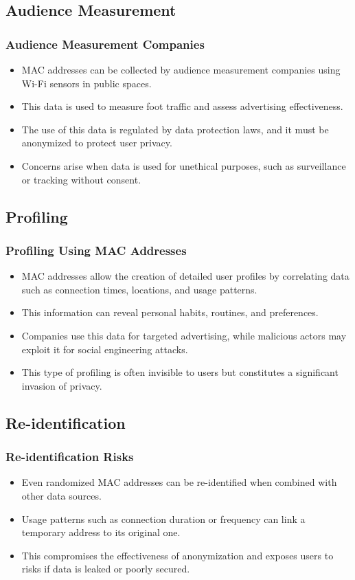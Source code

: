 \documentclass[
	11pt, %
]{beamer}
\begin{document}
\begin{frame}
  \section{Audience Measurement}
  \frametitle{Audience Measurement Companies}
  \begin{itemize}
    \item MAC addresses can be collected by audience measurement companies using Wi-Fi sensors in public spaces. \pause
    \item This data is used to measure foot traffic and assess advertising effectiveness. \pause
    \item The use of this data is regulated by data protection laws, and it must be anonymized to protect user privacy. \pause
    \item Concerns arise when data is used for unethical purposes, such as surveillance or tracking without consent. 
  \end{itemize}
\end{frame}

\begin{frame}
  \section{Profiling}
  \frametitle{Profiling Using MAC Addresses}
  \begin{itemize}
    \item MAC addresses allow the creation of detailed user profiles by correlating data such as connection times, locations, and usage patterns. \pause
    \item This information can reveal personal habits, routines, and preferences. \pause
    \item Companies use this data for targeted advertising, while malicious actors may exploit it for social engineering attacks. \pause
    \item This type of profiling is often invisible to users but constitutes a significant invasion of privacy. 
  \end{itemize}
\end{frame}

\begin{frame}
  \section{Re-identification}
  \frametitle{Re-identification Risks}
  \begin{itemize}
    \item Even randomized MAC addresses can be re-identified when combined with other data sources. \pause
    \item Usage patterns such as connection duration or frequency can link a temporary address to its original one. \pause
    \item This compromises the effectiveness of anonymization and exposes users to risks if data is leaked or poorly secured. 
  \end{itemize}
\end{frame}
\end{document}
